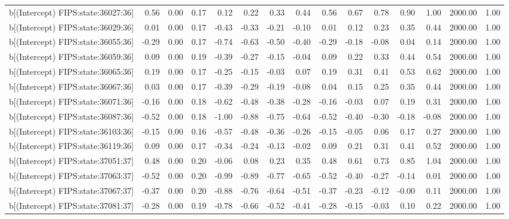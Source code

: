 \begin{table}[ht]
\begin{tabular}{rrrrrrrrrrrrrrr}
  b[(Intercept) FIPS:state:36027:36] & 0.56 & 0.00 & 0.17 & 0.12 & 0.22 & 0.33 & 0.44 & 0.56 & 0.67 & 0.78 & 0.90 & 1.00 & 2000.00 & 1.00 \\ 
  b[(Intercept) FIPS:state:36029:36] & 0.01 & 0.00 & 0.17 & -0.43 & -0.33 & -0.21 & -0.10 & 0.01 & 0.12 & 0.23 & 0.35 & 0.44 & 2000.00 & 1.00 \\ 
  b[(Intercept) FIPS:state:36055:36] & -0.29 & 0.00 & 0.17 & -0.74 & -0.63 & -0.50 & -0.40 & -0.29 & -0.18 & -0.08 & 0.04 & 0.14 & 2000.00 & 1.00 \\ 
  b[(Intercept) FIPS:state:36059:36] & 0.09 & 0.00 & 0.19 & -0.39 & -0.27 & -0.15 & -0.04 & 0.09 & 0.22 & 0.33 & 0.44 & 0.54 & 2000.00 & 1.00 \\ 
  b[(Intercept) FIPS:state:36065:36] & 0.19 & 0.00 & 0.17 & -0.25 & -0.15 & -0.03 & 0.07 & 0.19 & 0.31 & 0.41 & 0.53 & 0.62 & 2000.00 & 1.00 \\ 
  b[(Intercept) FIPS:state:36067:36] & 0.03 & 0.00 & 0.17 & -0.39 & -0.29 & -0.19 & -0.08 & 0.04 & 0.15 & 0.25 & 0.35 & 0.44 & 2000.00 & 1.00 \\ 
  b[(Intercept) FIPS:state:36071:36] & -0.16 & 0.00 & 0.18 & -0.62 & -0.48 & -0.38 & -0.28 & -0.16 & -0.03 & 0.07 & 0.19 & 0.31 & 2000.00 & 1.00 \\ 
  b[(Intercept) FIPS:state:36087:36] & -0.52 & 0.00 & 0.18 & -1.00 & -0.88 & -0.75 & -0.64 & -0.52 & -0.40 & -0.30 & -0.18 & -0.08 & 2000.00 & 1.00 \\ 
  b[(Intercept) FIPS:state:36103:36] & -0.15 & 0.00 & 0.16 & -0.57 & -0.48 & -0.36 & -0.26 & -0.15 & -0.05 & 0.06 & 0.17 & 0.27 & 2000.00 & 1.00 \\ 
  b[(Intercept) FIPS:state:36119:36] & 0.09 & 0.00 & 0.17 & -0.34 & -0.24 & -0.13 & -0.02 & 0.09 & 0.21 & 0.31 & 0.41 & 0.52 & 2000.00 & 1.00 \\ 
  b[(Intercept) FIPS:state:37051:37] & 0.48 & 0.00 & 0.20 & -0.06 & 0.08 & 0.23 & 0.35 & 0.48 & 0.61 & 0.73 & 0.85 & 1.04 & 2000.00 & 1.00 \\ 
  b[(Intercept) FIPS:state:37063:37] & -0.52 & 0.00 & 0.20 & -0.99 & -0.89 & -0.77 & -0.65 & -0.52 & -0.40 & -0.27 & -0.14 & 0.01 & 2000.00 & 1.00 \\ 
  b[(Intercept) FIPS:state:37067:37] & -0.37 & 0.00 & 0.20 & -0.88 & -0.76 & -0.64 & -0.51 & -0.37 & -0.23 & -0.12 & -0.00 & 0.11 & 2000.00 & 1.00 \\ 
  b[(Intercept) FIPS:state:37081:37] & -0.28 & 0.00 & 0.19 & -0.78 & -0.66 & -0.52 & -0.41 & -0.28 & -0.15 & -0.03 & 0.10 & 0.22 & 2000.00 & 1.00 \\ 

\end{tabular}
\end{table}
